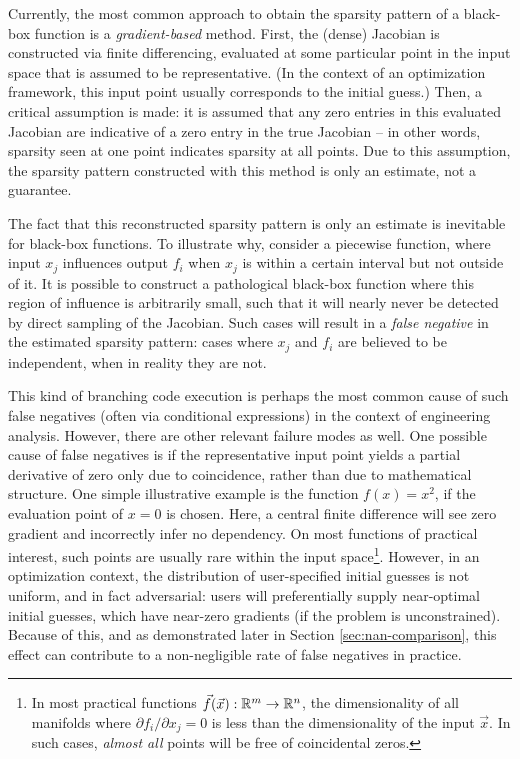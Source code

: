 Currently, the most common approach to obtain the sparsity pattern of a black-box function is a \emph{gradient-based} method. First, the (dense) Jacobian is constructed via finite differencing, evaluated at some particular point in the input space that is assumed to be representative. (In the context of an optimization framework, this input point usually corresponds to the initial guess.) Then, a critical assumption is made: it is assumed that any zero entries in this evaluated Jacobian are indicative of a zero entry in the true Jacobian -- in other words, sparsity seen at one point indicates sparsity at all points. Due to this assumption, the sparsity pattern constructed with this method is only an estimate, not a guarantee.

The fact that this reconstructed sparsity pattern is only an estimate is inevitable for black-box functions. To illustrate why, consider a piecewise function, where input $x_j$ influences output $f_i$ when $x_j$ is within a certain interval but not outside of it. It is possible to construct a pathological black-box function where this region of influence is arbitrarily small, such that it will nearly never be detected by direct sampling of the Jacobian. Such cases will result in a \emph{false negative} in the estimated sparsity pattern: cases where $x_j$ and $f_i$ are believed to be independent, when in reality they are not.

This kind of branching code execution is perhaps the most common cause of such false negatives (often via conditional expressions) in the context of engineering analysis. However, there are other relevant failure modes as well. One possible cause of false negatives is if the representative input point yields a partial derivative of zero only due to coincidence, rather than due to mathematical structure. One simple illustrative example is the function $f(x) = x^2$, if the evaluation point of $x = 0$ is chosen. Here, a central finite difference will see zero gradient and incorrectly infer no dependency. On most functions of practical interest, such points are usually rare within the input space\footnote{In most practical functions $\vec{f}(\vec{x}): \mathbb{R}^m \rightarrow \mathbb{R}^n$, the dimensionality of all manifolds where $\partial f_i/\partial x_j=0$ is less than the dimensionality of the input $\vec{x}$. In such cases, \emph{almost all} points will be free of coincidental zeros.}. However, in an optimization context, the distribution of user-specified initial guesses is not uniform, and in fact adversarial: users will preferentially supply near-optimal initial guesses, which have near-zero gradients (if the problem is unconstrained). Because of this, and as demonstrated later in Section \ref{sec:nan-comparison}, this effect can contribute to a non-negligible rate of false negatives in practice.

